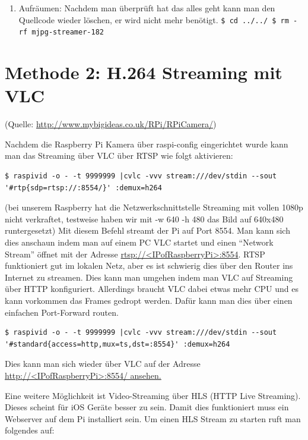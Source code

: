 \documentclass[12pt,a4paper,titlepage]{scrartcl} %
\begin{document}
\begin{enumerate}
\item Aufräumen:\newline
\textnormal{Nachdem man überprüft hat das alles geht kann man den Quellcode wieder löschen, er wird nicht mehr benötigt.}\newline
\texttt{\$ cd ../../\newline
\$ rm -rf mjpg-streamer-182}
\end{enumerate}

\newpage
\section{Methode 2: H.264 Streaming mit VLC}
\small{(Quelle: \href{http://www.mybigideas.co.uk/RPi/RPiCamera/}{http://www.mybigideas.co.uk/RPi/RPiCamera/})}
\normalsize

Nachdem die Raspberry Pi Kamera über raspi-config eingerichtet wurde kann man das Streaming über VLC über RTSP wie folgt aktivieren:

\ttfamily
\begin{lstlisting}[breaklines]
$ raspivid -o - -t 9999999 |cvlc -vvv stream:///dev/stdin --sout '#rtp{sdp=rtsp://:8554/}' :demux=h264
\end{lstlisting}

\normalfont
(bei unserem Raspberry hat die Netzwerkschnittstelle Streaming mit vollen 1080p nicht verkraftet, testweise haben wir mit -w 640 -h 480 das Bild auf 640x480 runtergesetzt)
Mit diesem Befehl streamt der Pi auf Port 8554. Man kann sich dies anschaun indem man auf einem PC VLC startet und einen “Network Stream” öffnet mit der Adresse \url{rtsp://<IPofRaspberryPi>:8554}. RTSP funktioniert gut im lokalen Netz, aber es ist schwierig dies über den Router ins Internet zu streamen. Dies kann man umgehen indem man VLC auf Streaming über HTTP konfiguriert. Allerdings braucht VLC dabei etwas mehr CPU und es kann vorkommen das Frames gedropt werden. Dafür kann man dies über einen einfachen Port-Forward routen.

\ttfamily
\begin{lstlisting}[breaklines]
$ raspivid -o - -t 9999999 |cvlc -vvv stream:///dev/stdin --sout '#standard{access=http,mux=ts,dst=:8554}' :demux=h264
\end{lstlisting}

\normalfont
Dies kann man sich wieder über VLC auf der Adresse \url{http://<IPofRaspberryPi>:8554/ ansehen.}

Eine weitere Möglichkeit ist Video-Streaming über HLS (HTTP Live Streaming). Dieses scheint für iOS Geräte besser zu sein. Damit dies funktioniert muss ein Webserver auf dem Pi installiert sein. Um einen HLS Stream zu starten ruft man folgendes auf:
\end{document}
